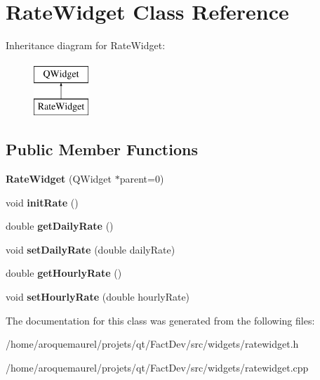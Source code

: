 \hypertarget{classRateWidget}{\section{Rate\-Widget Class Reference}
\label{classRateWidget}
}
Inheritance diagram for Rate\-Widget\-:\begin{figure}[H]
\begin{center}
\leavevmode
\includegraphics[height=2.000000cm]{dc/da5/classRateWidget}
\end{center}
\end{figure}
\subsection*{Public Member Functions}
\begin{DoxyCompactItemize}
\item 
\hypertarget{classRateWidget_ad1cb6a97e47b408043e83708ff8af15e}{{\bfseries Rate\-Widget} (Q\-Widget $\ast$parent=0)}\label{classRateWidget_ad1cb6a97e47b408043e83708ff8af15e}

\item 
\hypertarget{classRateWidget_a4a3ec9a546055d6ecb3bd1a9ee8082a6}{void {\bfseries init\-Rate} ()}\label{classRateWidget_a4a3ec9a546055d6ecb3bd1a9ee8082a6}

\item 
\hypertarget{classRateWidget_a0a72cea5ff524b47e513dcb21aea2022}{double {\bfseries get\-Daily\-Rate} ()}\label{classRateWidget_a0a72cea5ff524b47e513dcb21aea2022}

\item 
\hypertarget{classRateWidget_a8a3bccabb5c33e9f617ed85a68398b5a}{void {\bfseries set\-Daily\-Rate} (double daily\-Rate)}\label{classRateWidget_a8a3bccabb5c33e9f617ed85a68398b5a}

\item 
\hypertarget{classRateWidget_a50285d4472979e004c706ff5640e8227}{double {\bfseries get\-Hourly\-Rate} ()}\label{classRateWidget_a50285d4472979e004c706ff5640e8227}

\item 
\hypertarget{classRateWidget_a8135738c8a54389110de6751d9e2728e}{void {\bfseries set\-Hourly\-Rate} (double hourly\-Rate)}\label{classRateWidget_a8135738c8a54389110de6751d9e2728e}

\end{DoxyCompactItemize}


The documentation for this class was generated from the following files\-:\begin{DoxyCompactItemize}
\item 
/home/aroquemaurel/projets/qt/\-Fact\-Dev/src/widgets/ratewidget.\-h\item 
/home/aroquemaurel/projets/qt/\-Fact\-Dev/src/widgets/ratewidget.\-cpp\end{DoxyCompactItemize}
